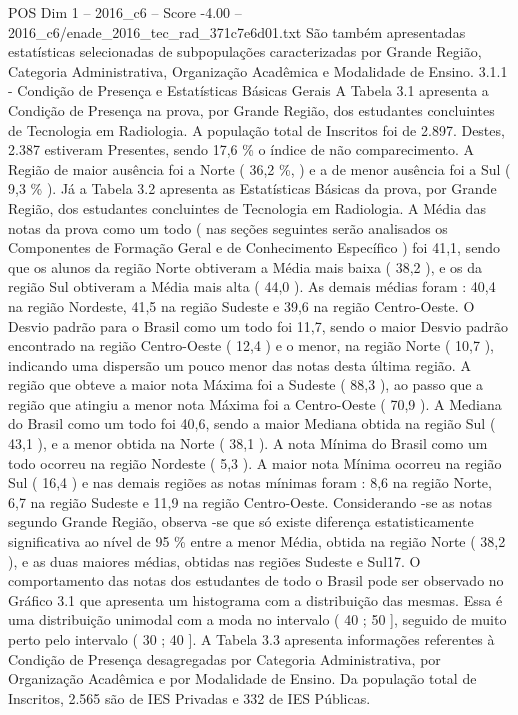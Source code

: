 \begin{textsample}{POS Dim 1 – 2016\_c6 – Score -4.00 – 2016\_c6/enade\_2016\_tec\_rad\_371c7e6d01.txt}
São também apresentadas estatísticas selecionadas de subpopulações caracterizadas por Grande Região, Categoria Administrativa, Organização Acadêmica e Modalidade de Ensino. 3.1.1 - Condição de Presença e Estatísticas Básicas Gerais A Tabela 3.1 apresenta a Condição de Presença na prova, por Grande Região, dos estudantes concluintes de Tecnologia em Radiologia.
A população total de Inscritos foi de 2.897.
Destes, 2.387 estiveram Presentes, sendo 17,6 \% o índice de não comparecimento.
A Região de maior ausência foi a Norte ( 36,2 \%, ) e a de menor ausência foi a Sul ( 9,3 \% ).
Já a Tabela 3.2 apresenta as Estatísticas Básicas da prova, por Grande Região, dos estudantes concluintes de Tecnologia em Radiologia.
A Média das notas da prova como um todo ( nas seções seguintes serão analisados os Componentes de Formação Geral e de Conhecimento Específico ) foi 41,1, sendo que os alunos da região Norte obtiveram a Média mais baixa ( 38,2 ), e os da região Sul obtiveram a Média mais alta ( 44,0 ).
As demais médias foram : 40,4 na região Nordeste, 41,5 na região Sudeste e 39,6 na região Centro-Oeste.
O Desvio padrão para o Brasil como um todo foi 11,7, sendo o maior Desvio padrão encontrado na região Centro-Oeste ( 12,4 ) e o menor, na região Norte ( 10,7 ), indicando uma dispersão um pouco menor das notas desta última região.
A região que obteve a maior nota Máxima foi a Sudeste ( 88,3 ), ao passo que a região que atingiu a menor nota Máxima foi a Centro-Oeste ( 70,9 ).
A Mediana do Brasil como um todo foi 40,6, sendo a maior Mediana obtida na região Sul ( 43,1 ), e a menor obtida na Norte ( 38,1 ).
A nota Mínima do Brasil como um todo ocorreu na região Nordeste ( 5,3 ).
A maior nota Mínima ocorreu na região Sul ( 16,4 ) e nas demais regiões as notas mínimas foram : 8,6 na região Norte, 6,7 na região Sudeste e 11,9 na região Centro-Oeste.
Considerando -se as notas segundo Grande Região, observa -se que só existe diferença estatisticamente significativa ao nível de 95 \% entre a menor Média, obtida na região Norte ( 38,2 ), e as duas maiores médias, obtidas nas regiões Sudeste e Sul17.
O comportamento das notas dos estudantes de todo o Brasil pode ser observado no Gráfico 3.1 que apresenta um histograma com a distribuição das mesmas.
Essa é uma distribuição unimodal com a moda no intervalo ( 40 ; 50 ], seguido de muito perto pelo intervalo ( 30 ; 40 ].
A Tabela 3.3 apresenta informações referentes à Condição de Presença desagregadas por Categoria Administrativa, por Organização Acadêmica e por Modalidade de Ensino.
Da população total de Inscritos, 2.565 são de IES Privadas e 332 de IES Públicas.

\end{textsample}
